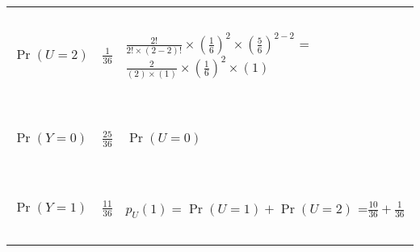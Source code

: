 \documentclass[journal,12pt,onecolumn]{IEEEtran}
\providecommand{\pr}[1]{\ensuremath{\Pr\left(#1\right)}}
\providecommand{\brak}[1]{\ensuremath{\left(#1\right)}}
\theoremstyle{remark}
\begin{document}
\begin{enumerate}
\begin{tabular}{|l|l|l|}
\hline
\ & \ & \  \\
$\pr{U=2}$  & \Large $\frac{1}{36}$ & \large $\frac{2!}{2!\times(2-2)!}\times\brak{\frac{1}{6}}^{2}\times\brak{\frac{5}{6}}^{2-2}$ 
= \large $\frac{2}{(2)\times(1)}\times\brak{\frac{1}{6}}^{2}\times(1)$\\
\ & \ & \  \\
\hline
\ & \ & \ \\
\large $\pr{Y=0}$ & \Large{$\frac{25}{36}$} & \large $\pr{U=0}$ \\
\ & \ & \ \\ 
\hline
\ & \ & \ \\
\large $\pr{Y=1}$ & \Large $\frac{11}{36}$ \large & $p_U(1) =\pr{U=1}+\pr{U=2}$ =$\frac{10}{36}+ \frac{1}{36}$   \\
\ & \ & \ \\
\hline
\end{tabular}

\end{enumerate}
\end{document}
